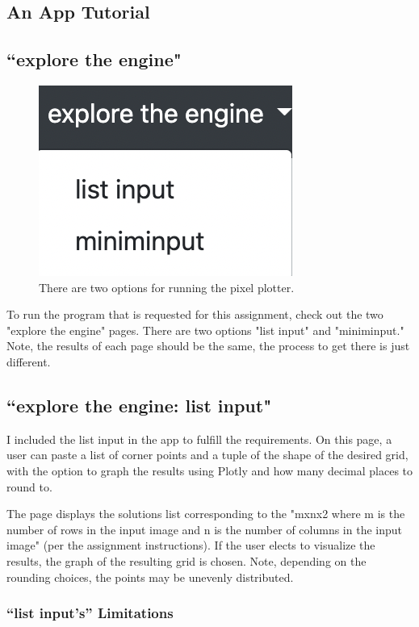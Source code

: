 \documentclass[10pt]{article}
\begin{document}
\begin{multicols*}{2}
\section{An App Tutorial}

\subsection{``explore the engine"}

\begin{figure}[H]
    \centering
	\includegraphics[width=.5\columnwidth]{ete.png}
	\caption{There are two options for running the pixel plotter.}
	\label{fig:fig4}
\end{figure}
 
To run the program that is requested for this assignment, check out the two "explore the engine" pages. There are two options "list input" and "miniminput." Note, the results of each page should be the same, the process to get there is just different.

\subsection{``explore the engine: list input"}

I included the list input in the app to fulfill the requirements. On this page, a user can paste a list of corner points and a tuple of the shape of the desired grid, with the option to graph the results using Plotly and how many decimal places to round to. 

The page displays the solutions list corresponding to the "mxnx2 where m is the number of rows in the input image and n is the number of columns in the input image" (per the assignment instructions). If the user elects to visualize the results, the graph of the resulting grid is chosen. Note, depending on the rounding choices, the points may be unevenly distributed.

\subsubsection{``list input's'' Limitations}


\end{multicols*}
\end{document}
